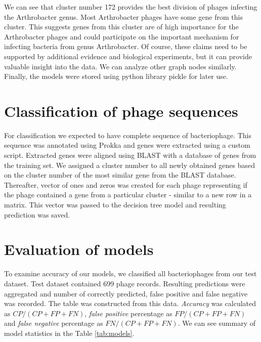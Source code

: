 We can see that cluster number 172 provides the best division of phages infecting the Arthrobacter genus.
Most Arthrobacter phages have some gene from this cluster.
This suggests genes from this cluster are of high importance for the Arthrobacter phages and could participate on the important mechanism for infecting bacteria from genus Arthrobacter.
Of course, these claims need to be supported by additional evidence and biological experiments, but it can provide valuable insight into the data.
We can analyze other graph nodes similarly.
Finally, the models were stored using python library pickle for later use.


\section{Classification of phage sequences}
For classification we expected to have complete sequence of bacteriophage.
This sequence was annotated using Prokka and genes were extracted using a custom script.
Extracted genes were aligned using BLAST with a database of genes from the training set.
We assigned a cluster number to all newly obtained genes based on the cluster number of the most similar gene from the BLAST database.
Thereafter, vector of ones and zeros was created for each phage representing if  the phage contained a gene from a particular cluster - similar to a new row in a matrix.
This vector was passed to the decision tree model and resulting prediction was saved.

\section{Evaluation of models}
To examine accuracy of our models, we classified all bacteriophages from our test dataset.
Test dataset contained 699 phage records.
Resulting predictions were aggregated and number of correctly predicted, false positive and false negative was recorded.
The table was constructed from this data.
\emph{Accuracy} was calculated as $CP/(CP+FP+FN)$, \emph{false positive} percentage as $FP/(CP+FP+FN)$ and \emph{false negative} percentage as $FN/(CP+FP+FN)$.
We can see summary of model statistics in the Table \ref{tab:models}.

